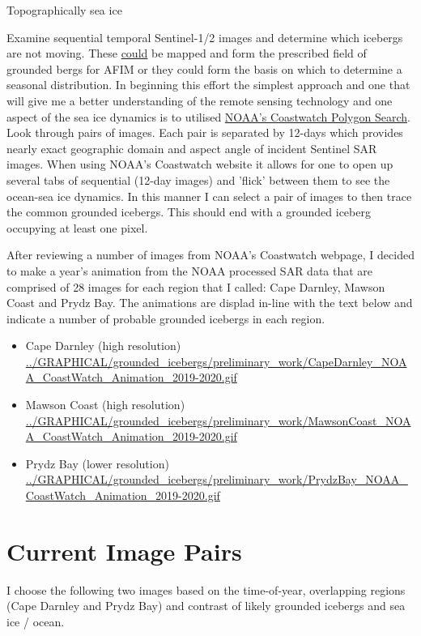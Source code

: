 \documentclass[11pt]{article}
\begin{document}
Topographically sea ice

Examine sequential temporal Sentinel-1/2 images and determine which icebergs are not moving. These
\uline{could} be mapped and form the prescribed field of grounded bergs for AFIM or they could form the
basis on which to determine a seasonal distribution. In beginning this effort the simplest
approach and one that will give me a better understanding of the remote sensing technology and one
aspect of the sea ice dynamics is to utilised \href{https://coastwatch.noaa.gov/cw\_html/cw\_polygon\_search.html}{NOAA's Coastwatch Polygon Search}. Look through pairs
of images. Each pair is separated by 12-days which provides nearly exact geographic domain and
aspect angle of incident Sentinel SAR images. When using NOAA's Coastwatch website it allows for
one to open up several tabs of sequential (12-day images) and 'flick' between them to see the
ocean-sea ice dynamics. In this manner I can select a pair of images to then trace the common
grounded icebergs. This should end with a grounded iceberg occupying
at least one pixel.

After reviewing a number of images from NOAA's Coastwatch webpage, I
decided to make a year's animation from the NOAA processed SAR data
that are comprised of 28 images for each region that I called: Cape
Darnley, Mawson Coast and Prydz Bay. The animations are displad
in-line with the text below and indicate a number of probable
grounded icebergs in each region. 

\begin{itemize}
\item Cape Darnley (high resolution)
\url{../GRAPHICAL/grounded\_icebergs/preliminary\_work/CapeDarnley\_NOAA\_CoastWatch\_Animation\_2019-2020.gif}
\item Mawson Coast (high resolution)
\url{../GRAPHICAL/grounded\_icebergs/preliminary\_work/MawsonCoast\_NOAA\_CoastWatch\_Animation\_2019-2020.gif}
\item Prydz Bay (lower resolution)
\url{../GRAPHICAL/grounded\_icebergs/preliminary\_work/PrydzBay\_NOAA\_CoastWatch\_Animation\_2019-2020.gif}
\end{itemize}

\section{Current Image Pairs}
\label{sec:orga5bca97}

I choose the following two images based on the time-of-year,
overlapping regions (Cape Darnley and Prydz Bay) and contrast of
likely grounded icebergs and sea ice / ocean.  
\end{document}
